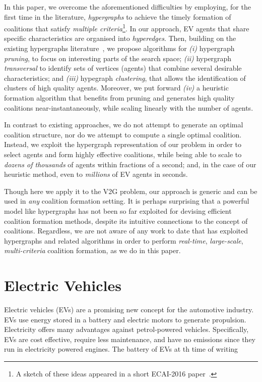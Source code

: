 In this paper, we overcome the aforementioned difficulties by employing, for the first time in the literature, {\em hypergraphs} to achieve the timely formation of coalitions that satisfy {\em multiple criteria}\footnote{A sketch of these ideas appeared in a short ECAI-2016 paper~\cite{christianos2016}.}. In our approach, EV agents that share specific characteristics are organised into {\em hyperedges}. Then, building on the existing hypergraphs 
literature~\cite{eiter1995identifying,zhou2006learning}, we propose algorithms for {\em (i)} hypergraph {\em pruning},  to focus on interesting parts of the search space; 
{\em (ii)}  hypergraph {\em transversal} to identify sets of vertices (agents) that combine several desirable characteristics; and {\em (iii)} hypegraph {\em clustering}, that allows the identification of clusters of high quality agents. Moreover, we put forward {\em (iv)}  a heuristic formation algorithm that benefits from pruning and generates high quality coalitions near-instantaneously, while scaling linearly with the number of agents.

In contrast to existing approaches, we do not attempt to generate an optimal coalition structure, nor do we attempt to compute a single optimal coalition.
Instead, we exploit the hypergraph representation of our problem in order to select agents and form highly effective coalitions, while being able to scale to {\em dozens of thousands} of agents within fractions of a second; and, in the case of our heuristic method, even to {\em millions} of EV agents in seconds.

Though here we apply it to the V2G problem, our approach is generic and can be used in {\em any} coalition formation setting.
It is perhaps surprising that a powerful model like hypergraphs has not been so far exploited for devising efficient coalition formation methods, despite its intuitive connections to the concept of coalitions. Regardless, we are not aware of any work to date that has exploited hypergraphs and related algorithms in order to perform {\em real-time}, {\em large-scale}, {\em multi-criteria} coalition formation, as we do in this paper.

\section{Electric Vehicles}

Electric vehicles (EVs) are a promising new concept for the automotive industry. EVs use energy stored in a battery and electric motors to generate propulsion. Electricity offers many advantages against petrol-powered vehicles. Specifically, EVs are cost effective, require less maintenance, and have no emissions since they run in electricity powered engines. The battery of EVs at th time of writing 


